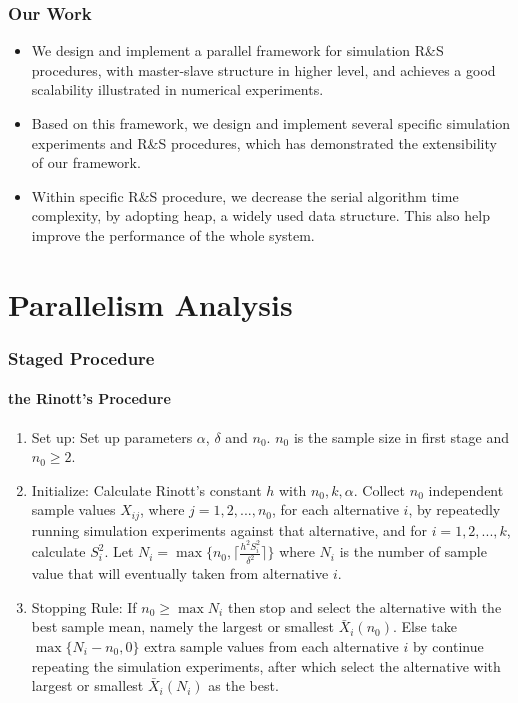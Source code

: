 \documentclass{beamer}
\begin{document}
\begin{frame}
\frametitle{Our Work}
\begin{itemize}
\item We design and implement a parallel framework for simulation R\&S procedures, with master-slave structure in higher level, and achieves a good scalability illustrated in numerical experiments.
\vspace{\baselineskip}
\item Based on this framework, we design and implement several specific simulation experiments and R\&S procedures, which has demonstrated the extensibility of our framework.
\vspace{\baselineskip}
\item Within specific R\&S procedure, we decrease the serial algorithm time complexity, by adopting heap, a widely used data structure. This also help improve the performance of the whole system.
\end{itemize}
\end{frame}

\section{Parallelism Analysis}

\begin{frame}
\frametitle{Staged Procedure}
\framesubtitle{the Rinott's Procedure}
\begin{enumerate}
\item{Set up: } Set up parameters $\alpha$, $\delta$ and $n_0$. $n_0$ is the sample size in first stage and $n_0 \geqslant 2$.
\item{Initialize: } Calculate Rinott's constant $h$ with $n_0, k, \alpha$. Collect $n_0$ independent sample values $X_{ij}$, where $j = 1, 2,...,n_0$, for each alternative $i$, by repeatedly running simulation experiments against that alternative, and for $i = 1, 2,...,k$, calculate $S_i^2$. Let 
$ N_i = \max\{n_0, \lceil \frac{h^2S_i^2}{\delta^2} \rceil\} $ where $N_i$ is the number of sample value that will eventually taken from alternative $i$.
\item{Stopping Rule: } If $n_0 \geqslant \max N_i$ then stop and select the alternative with the best sample mean, namely the largest or smallest $\bar{X}_i(n_0)$. Else take $\max\{N_i - n_0, 0\}$ extra sample values from each alternative $i$ by continue repeating the simulation experiments, after which select the alternative with largest or smallest $\bar{X}_i(N_i)$ as the best.
\end{enumerate}
\end{frame}
\end{document}
